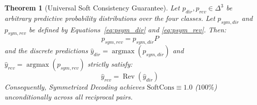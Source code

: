 \documentclass[11pt,a4paper,twocolumn]{article}
\newtheorem{theorem}{Theorem}
\begin{document}
\begin{theorem}[Universal Soft Consistency Guarantee]
\label{thm:consistency}
Let $p_{dir}, p_{rev} \in \Delta^3$ be arbitrary predictive probability distributions over the four classes. Let $p_{sym,dir}$ and $p_{sym,rev}$ be defined by Equations~\eqref{eq:psym_dir} and \eqref{eq:psym_rev}. Then:
\begin{equation}
p_{sym,rev} = p_{sym,dir} P
\end{equation}
and the discrete predictions $\hat{y}_{dir} = \operatorname{argmax}(p_{sym,dir})$ and $\hat{y}_{rev} = \operatorname{argmax}(p_{sym,rev})$ strictly satisfy:
\begin{equation}
\hat{y}_{rev} = \operatorname{Rev}(\hat{y}_{dir})
\end{equation}
Consequently, Symmetrized Decoding achieves $\text{SoftCons} \equiv 1.0$ ($100\%$) unconditionally across all reciprocal pairs.
\end{theorem}
\end{document}
